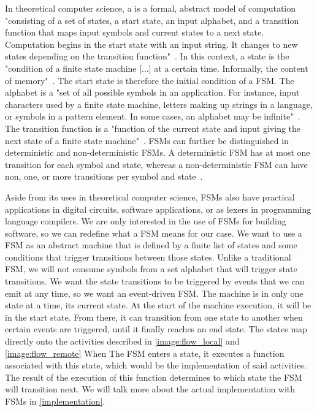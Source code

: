 In theoretical computer science, a  is a formal, abstract model of computation "consisting of a set of states, a start state, an input alphabet, and a transition function that maps input symbols and current states to a next state. Computation begins in the start state with an input string. It changes to new states depending on the transition function"~\autocite{fsm}.
In this context, a state is the "condition of a finite state machine [...] at a certain time. Informally, the content of memory"~\autocite{state}.
The start state is therefore the initial condition of a FSM.
The alphabet is a "set of all possible symbols in an application. For instance, input characters used by a finite state machine, letters making up strings in a language, or symbols in a pattern element. In some cases, an alphabet may be infinite"~\autocite{alphabet}.
The transition function is a "function of the current state and input giving the next state of a finite state machine"~\autocite{transitionfn}.
FSMs can further be distinguished in deterministic and non-deterministic FSMs.
A deterministic FSM has at most one transition for each symbol and state, whereas a non-deterministic FSM can have non, one, or more transitions per symbol and state~\autocite{deterministic}.

Aside from its uses in theoretical computer science, FSMs also have practical applications in digital circuits, software applications, or as lexers in programming language compilers.
We are only interested in the use of FSMs for building software, so we can redefine what a FSM means for our case.
We want to use a FSM as an abstract machine that is defined by a finite list of states and some conditions that trigger transitions between those states.
Unlike a traditional FSM, we will not consume symbols from a set alphabet that will trigger state transitions.
We want the state transitions to be triggered by events that we can emit at any time, so we want an event-driven FSM.
The machine is in only one state at a time, its current state.
At the start of the machine execution, it will be in the start state.
From there, it can transition from one state to another when certain events are triggered, until it finally reaches an end state.
The states map directly onto the activities described in \autoref{image:flow_local} and \autoref{image:flow_remote}
When The FSM enters a state, it executes a function associated with this state, which would be the implementation of said activities.
The result of the execution of this function determines to which state the FSM will transition next.
We will talk more about the actual implementation with FSMs in \autoref{implementation}.
